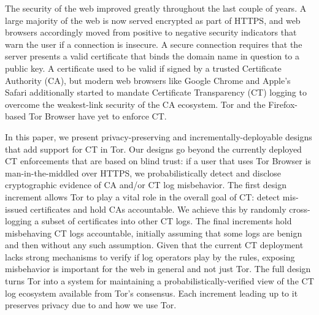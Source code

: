 The security of the web improved greatly throughout the last couple of years.
A large majority of the web is now served encrypted as part of HTTPS, and
web browsers accordingly moved from positive to negative security indicators
that warn the user if a connection is insecure.  A secure connection requires
that the server presents a valid certificate that binds the domain name in
question to a public key.  A certificate used to be valid if signed by a trusted
Certificate Authority (CA), but modern web browsers like Google Chrome and
Apple's Safari additionally started to mandate Certificate Transparency (CT)
logging to overcome the weakest-link security of the CA ecosystem.  Tor and the
Firefox-based Tor Browser have yet to enforce CT.

\hspace{12pt}
In this paper, we present privacy-preserving and incrementally-deployable
designs that add support for CT in Tor. Our designs go beyond the currently
deployed CT enforcements that are based on blind trust:
	if a user that uses Tor Browser is man-in-the-middled over HTTPS,
	we probabilistically detect and disclose cryptographic evidence of CA and/or
	CT log misbehavior.
The first design increment allows Tor to play a vital role in the overall goal
of CT:
	detect mis-issued certificates and hold CAs accountable.
We achieve this by randomly cross-logging a subset of certificates into other CT
logs.  The final increments hold misbehaving CT logs accountable, initially
assuming that some logs are benign and then without any such assumption.
Given that the current CT deployment lacks strong mechanisms to verify if log
operators play by the rules, exposing misbehavior is important for the web in
general and not just Tor.  The full design turns Tor into a system for
maintaining a probabilistically-verified view of the CT log ecosystem available
from Tor's consensus.  Each increment leading up to it preserves privacy due to
and how we use Tor.

